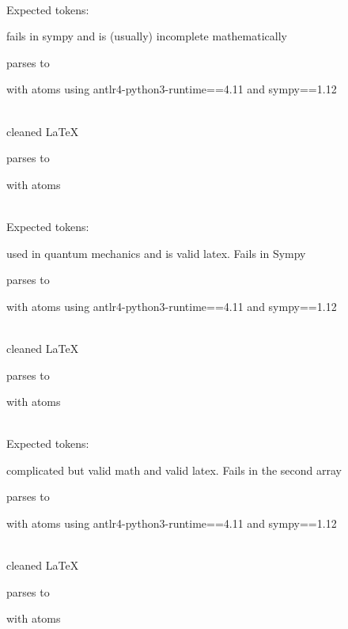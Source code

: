\documentclass{article}
\begin{document}
\ \\
Expected tokens:



\hrulefill

fails in sympy and is (usually) incomplete mathematically

parses to

with atoms
using antlr4-python3-runtime==4.11 and sympy==1.12

\ \\
cleaned \LaTeX

parses to

with atoms


\ \\
Expected tokens:


\hrulefill

used in quantum mechanics and is valid latex. Fails in Sympy

parses to

with atoms
using antlr4-python3-runtime==4.11 and sympy==1.12

\ \\
cleaned \LaTeX

parses to

with atoms


\ \\
Expected tokens:


\hrulefill

complicated but valid math and valid latex. Fails in the second array  

parses to

with atoms
using antlr4-python3-runtime==4.11 and sympy==1.12

\ \\
cleaned \LaTeX

parses to

with atoms

\end{document}
